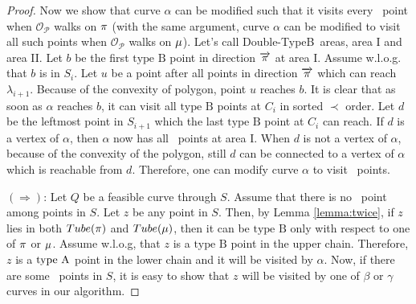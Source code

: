 \documentclass[a4paper,UKenglish]{lipics}
\newcommand{\eps}{\varepsilon}
\newcommand{\REM}[1]{}
\newcommand{\CO}{{\mathscr O}}
\newcommand{\Pol}{{\mathscr P}}
\newcommand{\CH}{{\mathscr CH}}
\newcommand{\DoubleB}{Double-TypeB}
\newcommand{\Dir}{\overrightarrow}
\newcommand{\lei}{\prec}
\newcommand{\pset}{S}
\newcommand{\SemiBad}{\mbox{type B}}
\newcommand{\lme}[1]{{\lambda_{#1}}}
\begin{document}
\begin{proof}
Now we show that curve $\alpha$ can be modified such 
that it visits every \TwiceB ~point when $\CO_\Pol$ walks on $\pi$
(with the same argument, curve $\alpha$ can be modified to 
visit all such points when $\CO_\Pol$ walks on $\mu$).
Let's call \DoubleB~areas, area I and area II.
Let $b$ be the first $\SemiBad$ point in 
direction $\Dir{\Upper}$ at area I. 
Assume w.l.o.g. that $b$ is in $\pset_{i}$.
Let $u$ be a point after all points in direction $\Dir{\Upper}$
which can reach $\lme{i+1}$.
Because of the convexity of polygon,
point $u$ reaches $b$. 
It is clear that as soon as $\alpha$  reaches $b$, 
it can visit all $\SemiBad$ points 
at $C_i$ in sorted $\lei$ order. 
Let $d$ be the leftmost point 
in $\pset_{i+1}$ which the last 
$\SemiBad$  point at $C_i$ can reach. 
If $d$ is a vertex of $\alpha$, then
$\alpha$ now has all  \TwiceB ~points at area I.
When $d$ is not a vertex of $\alpha$,
because of the convexity of the polygon, 
still $d$ can be connected to a 
vertex of $\alpha$ which is reachable from $d$. 
Therefore, one can modify curve $\alpha$
to visit \TwiceB ~points.






$(\Rightarrow)$:
Let $Q$ be a feasible curve through $S$.
Assume that there is  no \TwiceB ~point
among points in $\pset$. Let $z$ be any point in $\pset$.
Then, by Lemma \ref{lemma:twice}, if 
$z$ lies in both $Tube(\pi)$ and
$Tube(\mu)$, then it can be $\SemiBad$ only 
with respect to one of $\pi$ or $\mu$.
Assume w.l.o.g, that $z$ is a $\SemiBad$ point in the 
upper chain. Therefore, $z$ is a $\mbox{type A}$ point in the 
lower chain and  it will be visited by 
$\alpha$. Now, if  there are some \TwiceB ~points in $S$,
it is easy to show that  $z$ will be visited  by one of 
$\beta$ or $\gamma$ curves in our algorithm.





\REM{
\ref{} $\CO_\alpha$  and $\CO_P$
walk along their path, keeping distance $\eps$
to each other, until 
$\CO_C$  reaches to vertex $v$ in $\CH(S)$
and $\CO_P$ reaches to point $v' \in e_i$ on the boundary of $\Pol$
where $\|vv'\| \le \eps$.
}



\REM{
we can construct a feasible curve:
Lemma \ref{lemma:twice} ensures if a point 
which is $\SemiBad$ in the upper chain, 
can not be  $\SemiBad$  again in the lower chain
and vice versa, a point 
which is $\SemiBad$ in the lower chain, 
can not be  $\SemiBad$  again in the upper chain;
unless it is located within $\DoubleB$ area.

}
\end{proof}
\end{document}
